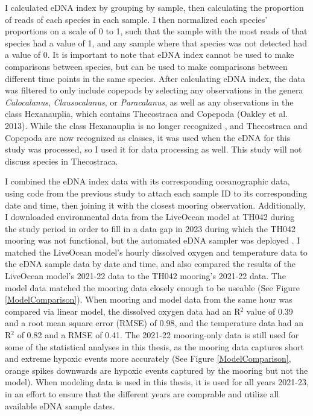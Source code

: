 \documentclass[12pt,twoside]{reedthesis}
\begin{document}
	I calculated eDNA index by grouping by sample, then calculating the proportion of reads of each species in each sample. I then normalized each species' proportions on a scale of 0 to 1, such that the sample with the most reads of that species had a value of 1, and any sample where that species was not detected had a value of 0. It is important to note that eDNA index cannot be used to make comparisons between species, but can be used to make comparisons between different time points in the same species. After calculating eDNA index, the data was filtered to only include copepods by selecting any observations in the genera \textit{Calocalanus}, \textit{Clausocalanus}, or \textit{Paracalanus}, as well as any observations in the class Hexanauplia, which contains Thecostraca and Copepoda (Oakley et al. 2013). While the class Hexanauplia is no longer recognized \autocite{WoRMSWorldRegister, Lozano-Fernandez2019}, and Thecostraca and Copepoda are now recognized as classes, it was used when the eDNA for this study was processed, so I used it for data processing as well. This study will not discuss species in Thecostraca.

	I combined the eDNA index data with its corresponding oceanographic data, using code from the previous study to attach each sample ID to its corresponding date and time, then joining it with the closest mooring observation. Additionally, I downloaded environmental data from the LiveOcean model at TH042 during the study period in order to fill in a data gap in 2023 during which the TH042 mooring was not functional, but the automated eDNA sampler was deployed \autocite{Siedlecki2015a, Fatland2016, LiveOceanHomepage}. I matched the LiveOcean model's hourly dissolved oxygen and temperature data to the eDNA sample data by date and time, and also compared the results of the LiveOcean model's 2021-22 data to the TH042 mooring's 2021-22 data. The model data matched the mooring data closely enough to be useable (See Figure \ref{ModelComparison}). When mooring and model data from the same hour was compared via linear model, the dissolved oxygen data had an R$^2$ value of 0.39 and a root mean square error (RMSE) of 0.98, and the temperature data had an R$^2$ of 0.82 and a RMSE of 0.41. The 2021-22 mooring-only data is still used for some of the statistical analyses in this thesis, as the mooring data captures short and extreme hypoxic events more accurately (See Figure \ref{ModelComparison}, orange spikes downwards are hypoxic events captured by the mooring but not the model). When modeling data is used in this thesis, it is used for all years 2021-23, in an effort to ensure that the different years are comprable and utilize all available eDNA sample dates. 
	
\end{document}
